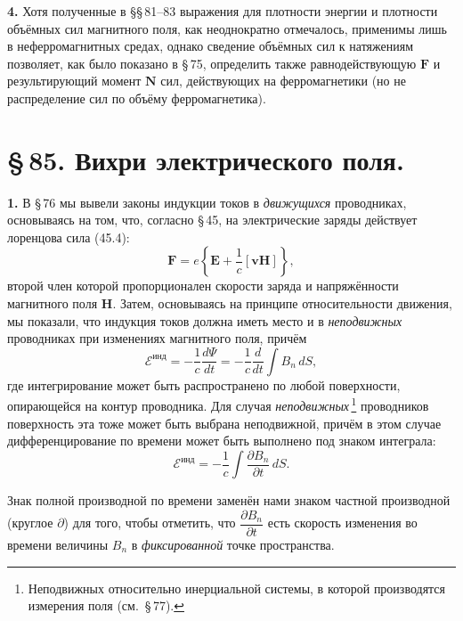 \documentclass[a4paper,10pt]{article}
\begin{document}

\textbf{4.} Хотя полученные в §§\,81–83 выражения для плотности энергии
и плотности объёмных сил магнитного поля, как неоднократно отмечалось,
применимы лишь в неферромагнитных средах, однако сведение объёмных сил
к натяжениям позволяет, как было показано в §\,75, определить также
равнодействующую $\mathbf{F}$ и результирующий момент $\mathbf{N}$ сил,
действующих на ферромагнетики (но не распределение сил по объёму
ферромагнетика).


\section*{\S\,85. Вихри электрического поля.}


\textbf{1.} В §\,76 мы вывели законы индукции токов в \textit{движущихся}
проводниках, основываясь на том, что, согласно §\,45, на электрические
заряды действует лоренцова сила (45.4):
$$
    \mathbf{F} = e\!\left\{\mathbf{E} + \frac{1}{c}[\mathbf{v}\mathbf{H}]\right\},
$$
второй член которой пропорционален скорости заряда и напряжённости
магнитного поля $\mathbf{H}$. Затем, основываясь на принципе
относительности движения, мы показали, что индукция токов должна иметь
место и в \textit{неподвижных} проводниках при изменениях магнитного
поля, причём
\begin{equation}
    \mathcal{E}^{\text{инд}} = -\frac{1}{c}\frac{d\Psi}{dt}
    = -\frac{1}{c}\frac{d}{dt}\int B_n\,dS,
    \tag{85.1}
\end{equation}
где интегрирование может быть распространено по любой поверхности,
опирающейся на контур проводника. Для случая \textit{неподвижных}\,\footnote{Неподвижных
относительно инерциальной системы, в которой производятся измерения
поля (см.\ §\,77).} проводников поверхность эта тоже может быть выбрана
неподвижной, причём в этом случае дифференцирование по времени может
быть выполнено под знаком интеграла:
$$
    \mathcal{E}^{\text{инд}} = -\frac{1}{c}\int\frac{\partial B_n}{\partial t}\,dS.
$$

Знак полной производной по времени заменён нами знаком частной
производной (круглое $\partial$) для того, чтобы отметить, что
$\dfrac{\partial B_n}{\partial t}$ есть скорость изменения во времени
величины $B_n$ в \textit{фиксированной} точке пространства.
\end{document}
